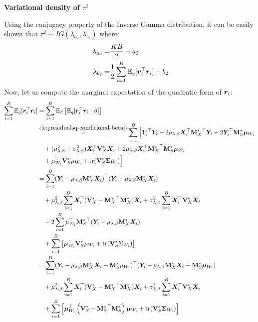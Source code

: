 \documentclass[numsec,webpdf,modern,medium,namedate]{oup-authoring-template}
\theoremstyle{thmstyleone}%
\theoremstyle{thmstyletwo}%
\theoremstyle{thmstylethree}%
\begin{document}
\textbf{Variational density of $\tau^2$}

Using the conjugacy property of the Inverse Gamma distribution, it can be easily shown that $\tau^2 \sim IG(\lambda_{a_2}, \lambda_{b_2})$ where:
\begin{equation*}
    \begin{split}
        \lambda_{a_2} = & \frac{KB}{2} + a_2\\\
        \lambda_{b_2} = & \frac{1}{2} \sum_{i=1}^B \mathbb{E}_q[\boldsymbol{r}_i^\top \boldsymbol{r}_i ] + b_2
    \end{split}
\end{equation*}
Now, let us compute the marginal expectation of the quadratic form of $\boldsymbol{r}_i$:
{\footnotesize
\begin{equation}\label{eq:error-qf-vi-exp}
    \begin{split}
        \sum_{i = 1}^B \mathbb{E}_q[\boldsymbol{r}_i^\top \boldsymbol{r}_i] 
& = \sum_{i = 1}^B \mathbb{E}_{\beta}\left[ \mathbb{E}_q[\boldsymbol{r}_i^\top \boldsymbol{r}_i \mid \beta] \right] \\
& \overset{(\ref{eq:residualsq-conditional-beta})}{=} \sum_{i = 1}^B \Big[ 
    \boldsymbol{Y}_i^\top \boldsymbol{Y}_i 
    - 2 \mu_{\lambda,\beta} \boldsymbol{X}_i^\top {\mathbf{M}^\ast_X}^\top \boldsymbol{Y}_i 
    - 2 \boldsymbol{Y}_i^\top \mathbf{M}^\ast_S \boldsymbol{\mu}_{W_i} \\
&\quad + (\mu^2_{\lambda, \beta} + \sigma^2_{\lambda, \beta}) \boldsymbol{X}_i^\top \mathbf{V}^\ast_X \boldsymbol{X}_i 
    + 2 \mu_{\lambda, \beta} \boldsymbol{X}_i^\top {\mathbf{M}^\ast_X}^\top \mathbf{M}^\ast_S \boldsymbol{\mu}_{W_i} \\
&\quad + \mu_{W_i}^\top \mathbf{V}^\ast_S \mu_{W_i} 
    + \text{tr}(\mathbf{V}^\ast_S \boldsymbol{\Sigma}_{W_i}) 
\Big] \\
& = \sum_{i = 1}^B (\boldsymbol{Y}_i - \mu_{\lambda, \beta} \mathbf{M}^\ast_X \boldsymbol{X}_i)^\top (\boldsymbol{Y}_i - \mu_{\lambda, \beta} \mathbf{M}^\ast_X \boldsymbol{X}_i) \\
&\quad + \mu^2_{\lambda, \beta} \sum_{i = 1}^B \boldsymbol{X}_i^\top (\mathbf{V}^\ast_X - {\mathbf{M}^\ast_X}^\top \mathbf{M}^\ast_X) \boldsymbol{X}_i + \sigma^2_{\lambda, \beta} \sum_{i = 1}^B \boldsymbol{X}_i^\top \mathbf{V}^\ast_X \boldsymbol{X}_i\\
&\quad - 2 \sum_{i = 1}^B \mu_{W_i}^\top {\mathbf{M}^\ast_S}^\top (\boldsymbol{Y}_i - \mu_{\lambda, \beta} \mathbf{M}^\ast_X \boldsymbol{X}_i) \\
&\quad + \sum_{i = 1}^B \left[ \boldsymbol{\mu}_{W_i}^\top \mathbf{V}^\ast_S \mu_{W_i} + \text{tr}(\mathbf{V}^\ast_S \Sigma_{W_i}) \right]\\
& = \sum_{i = 1}^B (\boldsymbol{Y}_i - \mu_{\lambda, \beta} \mathbf{M}^\ast_X \boldsymbol{X}_i - {\mathbf{M}^\ast_S}\mu_{W_i})^\top (\boldsymbol{Y}_i - \mu_{\lambda, \beta} \mathbf{M}^\ast_X \boldsymbol{X}_i - {\mathbf{M}^\ast_S}\boldsymbol{\mu}_{W_i} ) \\
&\quad + \mu^2_{\lambda, \beta} \sum_{i = 1}^B \boldsymbol{X}_i^\top (\mathbf{V}^\ast_X - {\mathbf{M}^\ast_X}^\top \mathbf{M}^\ast_X) \boldsymbol{X}_i + \sigma^2_{\lambda, \beta} \sum_{i = 1}^B \boldsymbol{X}_i^\top \mathbf{V}^\ast_X \boldsymbol{X}_i\\
&\quad + \sum_{i = 1}^B \left[ \boldsymbol{\mu}_{W_i}^\top \left(\mathbf{V}^\ast_S - {\mathbf{M}^\ast_S}^\top \mathbf{M}^\ast_S\right)\boldsymbol{\mu}_{W_i} + \mathrm{tr}(\mathbf{V}^\ast_S \boldsymbol{\Sigma}_{W_i}) \right]
    \end{split}    
\end{equation}}
\end{document}
